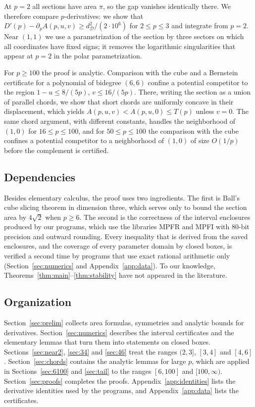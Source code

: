 \documentclass[11pt]{amsart}
\theoremstyle{definition}
\theoremstyle{remark}
\numberwithin{equation}{section}
\newcommand{\cD}{\mathcal{D}}
\begin{document}
At $p=2$ all sections have area $\pi$, so the gap vanishes identically there. We therefore compare $p$-derivatives: we show that $D'(p)-\partial_pA(p,u,v)\ge d_\cD^2/(2\cdot 10^6)$ for $2\le p\le 3$ and integrate from $p=2$. Near $(1,1)$ we use a parametrization of the section by three sectors on which all coordinates have fixed signs; it removes the logarithmic singularities that appear at $p=2$ in the polar parametrization.

For $p\ge 100$ the proof is analytic. Comparison with the cube and a Bernstein certificate for a polynomial of bidegree $(6,6)$ confine a potential competitor to the region $1-u\le 8/(5p)$, $v\le 16/(5p)$. There, writing the section as a union of parallel chords, we show that short chords are uniformly concave in their displacement, which yields $A(p,u,v)<A(p,u,0)\le T(p)$ unless $v=0$. The same chord argument, with different constants, handles the neighborhood of $(1,0)$ for $16\le p\le 100$, and for $50\le p\le100$ the comparison with the cube confines a potential competitor to a neighborhood of $(1,0)$ of size $O(1/p)$ before the complement is certified.

\subsection{Dependencies}
Besides elementary calculus, the proof uses two ingredients. The first is Ball's cube slicing theorem \cite{Ball} in dimension three, which serves only to bound the section area by $4\sqrt2$ when $p\ge 6$. The second is the correctness of the interval enclosures produced by our programs, which use the libraries MPFR \cite{MPFR} and MPFI \cite{MPFI} with $80$-bit precision and outward rounding. Every inequality that is derived from the saved enclosures, and the coverage of every parameter domain by closed boxes, is verified a second time by programs that use exact rational arithmetic only (Section~\ref{sec:numerics} and Appendix~\ref{app:data}). To our knowledge, Theorems~\ref{thm:main}--\ref{thm:stability} have not appeared in the literature.

\subsection{Organization}
Section~\ref{sec:prelim} collects area formulas, symmetries and analytic bounds for derivatives. Section~\ref{sec:numerics} describes the interval certificates and the elementary lemmas that turn them into statements on closed boxes. Sections~\ref{sec:near2}, \ref{sec:34} and \ref{sec:46} treat the ranges $(2,3]$, $[3,4]$ and $[4,6]$. Section~\ref{sec:chords} contains the analytic lemmas for large $p$, which are applied in Sections~\ref{sec:6100} and \ref{sec:tail} to the ranges $[6,100]$ and $[100,\infty)$. Section~\ref{sec:proofs} completes the proofs. Appendix~\ref{app:identities} lists the derivative identities used by the programs, and Appendix~\ref{app:data} lists the certificates.
\end{document}
